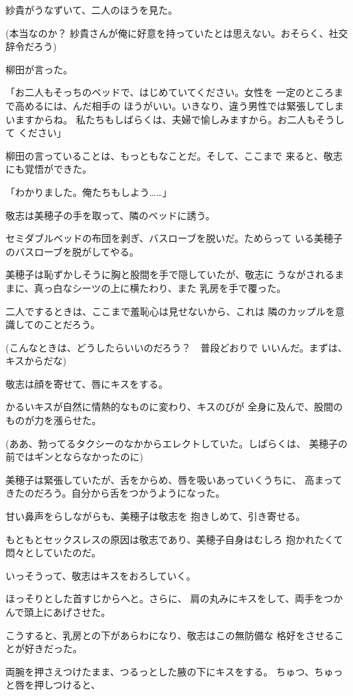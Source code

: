 ﻿\documentclass[
    book,tate,
    line_length=30zw,
    jafontsize=12pt,
    paper=b5j,
    landscape,
    ]{jlreq}
\begin{document}
紗貴がうなずいて、二人のほうを見た。

(本当なのか？ 紗貴さんが俺に好意を持っていたとは思えない。おそらく、社交辞令だろう)

柳田が言った。

「お二人もそっちのベッドで、はじめていてください。女性を
一定のところまで高めるには、んだ相手の
ほうがいい。いきなり、違う男性では緊張してしまいますからね。
私たちもしばらくは、夫婦で愉しみますから。お二人もそうして
ください」

柳田の言っていることは、もっともなことだ。そして、ここまで
来ると、敬志にも覚悟ができた。

「わかりました。俺たちもしよう……」

敬志は美穂子の手を取って、隣のベッドに誘う。

セミダブルベッドの布団を剥ぎ、バスローブを脱いだ。ためらって
いる美穂子のバスローブを脱がしてやる。

美穂子は恥ずかしそうに胸と股間を手で隠していたが、敬志に
うながされるままに、真っ白なシーツの上に横たわり、また
乳房を手で覆った。

二人でするときは、ここまで羞恥心は見せないから、これは
隣のカップルを意識してのことだろう。

(こんなときは、どうしたらいいのだろう？　普段どおりで
いいんだ。まずは、キスからだな)

敬志は顔を寄せて、唇にキスをする。

かるいキスが自然に情熱的なものに変わり、キスのびが
全身に及んで、股間のものが力を漲らせた。

(ああ、勃ってるタクシーのなかからエレクトしていた。しばらくは、
美穂子の前ではギンとならなかったのに)

美穂子は緊張していたが、舌をからめ、唇を吸いあっていくうちに、
高まってきたのだろう。自分から舌をつかうようになった。

甘い鼻声をらしながらも、美穂子は敬志を
抱きしめて、引き寄せる。

もともとセックスレスの原因は敬志であり、美穂子自身はむしろ
抱かれたくて悶々としていたのだ。

いっそうって、敬志はキスをおろしていく。

ほっそりとした首すじからへと。さらに、
肩の丸みにキスをして、両手をつかんで頭上にあげさせた。

こうすると、乳房との下があらわになり、敬志はこの無防備な
格好をさせることが好きだった。

両腕を押さえつけたまま、つるっとした腋の下にキスをする。
ちゅつ、ちゅっと唇を押しつけると、
\end{document}
